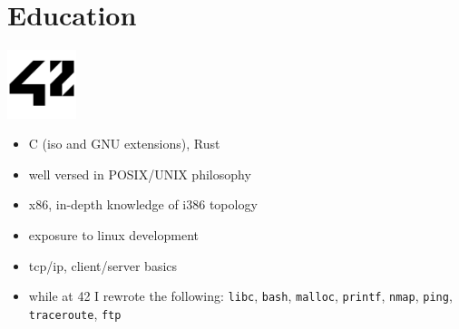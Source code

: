 \section{Education}

\noindent
\begin{minipage}{.15\textwidth}
\centerline{\includegraphics[width=20mm]{img/42}}
\end{minipage}%
\hspace{5mm}
\begin{minipage}{.9\textwidth}
\raggedright
\begin{minipage}[t]{.50\textwidth}
    \begin{itemize}
        \item C (iso and GNU extensions), Rust
        \item well versed in POSIX/UNIX philosophy
        \item x86, in-depth knowledge of i386 topology
        \item exposure to linux development
        \item tcp/ip, client/server basics
    \end{itemize}
\end{minipage}
\begin{minipage}[t]{.30\textwidth}
    \begin{itemize}
		\item while at 42 I rewrote the following: \texttt{libc}, \texttt{bash}, \texttt{malloc}, \texttt{printf}, \texttt{nmap}, \texttt{ping}, \texttt{traceroute}, \texttt{ftp}
    \end{itemize}
\end{minipage}
\end{minipage}

